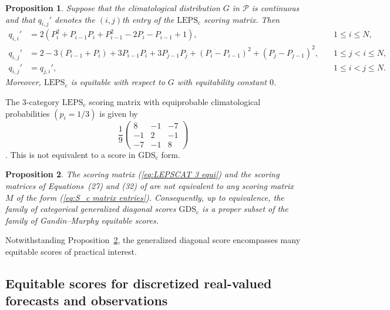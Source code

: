 \documentclass[10pt]{article} %
\theoremstyle{theorem}
\newtheorem{prop}{Proposition}
\theoremstyle{definition}
\newcommand{\GDSc}{\mathrm{GDS}_\mathrm{c}}
\newcommand{\LEPSc}{\mathrm{LEPS}_\mathrm{c}}
\begin{document}
\begin{prop}\label{prop:LEPSCAT}
Suppose that the climatological distribution $G$ in $\mathcal{P}$ is continuous and that $q_{i,j}'$ denotes the $(i,j)$th entry of the $\LEPSc$ scoring matrix. Then
\begin{align}
q_{i,i}' &= 2(P_i^2 +P_{i-1} P_i+P_{i-1}^2-2 P_i-P_{i-1}+1),\quad & 1\leq i \leq N, \label{eq:LEPSCAT entry 1}\\
q_{i,j}' &= 2 - 3(P_{i-1}+P_i) + 3 P_{i-1} P_i + 3 P_{j-1} P_j + (P_i-P_{i-1})^2 + (P_j-P_{j-1})^2,\quad & 1\leq j < i \leq N,  \label{eq:LEPSCAT entry 2} \\
q_{i,j}' &= q_{j,i}', & 1\leq i < j \leq N.  \label{eq:LEPSCAT entry 3}
\end{align}
Moreover, $\LEPSc$ is equitable with respect to $G$ with equitability constant $0$.
\end{prop}

The 3-category $\LEPSc$ scoring matrix with equiprobable climatological probabilities $(p_i=1/3)$ is given by
\begin{equation}\label{eq:LEPSCAT 3 equi}
\frac{1}{9}
\begin{pmatrix}
8 & -1 & -7 \\
-1 & 2 & -1 \\
-7 & -1 & 8
\end{pmatrix}
\end{equation}
\citep[Table~1]{potts1996revised}. This is not equivalent to a score in $\GDSc$ form.

\begin{prop}\label{prop:gandin murphy not GDS}
The scoring matrix (\ref{eq:LEPSCAT 3 equi}) and the scoring matrices of Equations~(27) and (32) of \citet{gandin1992equitable} are not equivalent to any scoring matrix $M$ of the form (\ref{eq:S_c matrix entries}). Consequently, up to equivalence, the family of categorical generalized diagonal scores $\GDSc$ is a proper subset of the family of Gandin--Murphy equitable scores.
\end{prop}

Notwithstanding Proposition~\ref{prop:gandin murphy not GDS}, the generalized diagonal score encompasses many equitable scores of practical interest.

\subsection{Equitable scores for discretized real-valued forecasts and observations}\label{ss:discretize}
\end{document}
